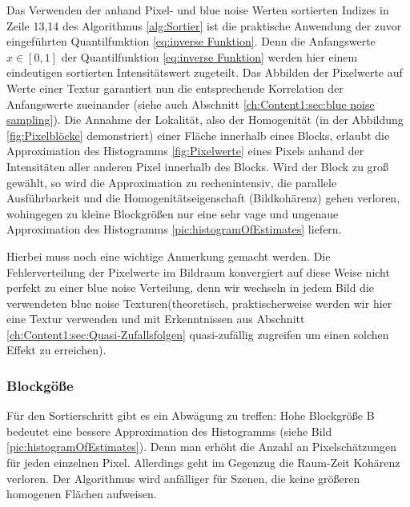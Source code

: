 Das Verwenden der anhand Pixel- und blue noise Werten sortierten Indizes in Zeile 13,14 des Algorithmus \ref{alg:Sortier} ist die praktische Anwendung der zuvor eingeführten 
Quantilfunktion \ref{eq:inverse Funktion}. Denn die Anfangswerte $x \in [0,1]$ der Quantilfunktion \ref{eq:inverse Funktion} werden hier einem eindeutigen sortierten Intensitätswert 
zugeteilt. Das Abbilden der Pixelwerte auf Werte einer  Textur garantiert nun die entsprechende Korrelation 
der Anfangswerte zueinander (siehe auch Abschnitt \ref{ch:Content1:sec:blue noise sampling}).
Die Annahme der Lokalität, also der Homogenität (in der Abbildung \ref{fig:Pixelblöcke} demonstriert) einer Fläche innerhalb eines Blocks, 
erlaubt die Approximation des Histogramms \ref{fig:Pixelwerte} eines Pixels anhand der Intensitäten aller anderen Pixel innerhalb des Blocks.
Wird der Block zu groß gewählt, so wird die Approximation zu rechenintensiv, die parallele Ausführbarkeit 
und die  Homogenitätseigenschaft (Bildkohärenz) gehen verloren, wohingegen zu kleine Blockgrößen nur eine sehr vage und ungenaue Approximation des 
Histogramms \ref{pic:histogramOfEstimates} liefern.

\par

Hierbei muss noch eine wichtige Anmerkung gemacht werden. Die Fehlerverteilung der Pixelwerte im Bildraum konvergiert auf diese Weise nicht perfekt zu einer 
blue noise Verteilung, denn wir wechseln in jedem Bild die verwendeten blue noise Texturen(theoretisch, praktischerweise werden wir hier eine
Textur verwenden und mit Erkenntnissen aus Abschnitt \ref{ch:Content1:sec:Quasi-Zufallsfolgen} quasi-zufällig zugreifen um einen solchen Effekt zu erreichen). 

\subsubsection{Blockgöße}
\label{subsec:Blockgröße}

Für den Sortierschritt gibt es ein Abwägung zu treffen: Hohe Blockgröße B bedeutet eine bessere Approximation 
des Histogramms (siehe Bild \ref{pic:histogramOfEstimates}). Denn man erhöht die Anzahl an Pixelschätzungen für
jeden einzelnen Pixel. Allerdings geht im Gegenzug die Raum-Zeit Kohärenz verloren. Der Algorithmus wird anfälliger 
für Szenen, die keine größeren homogenen Flächen aufweisen.

